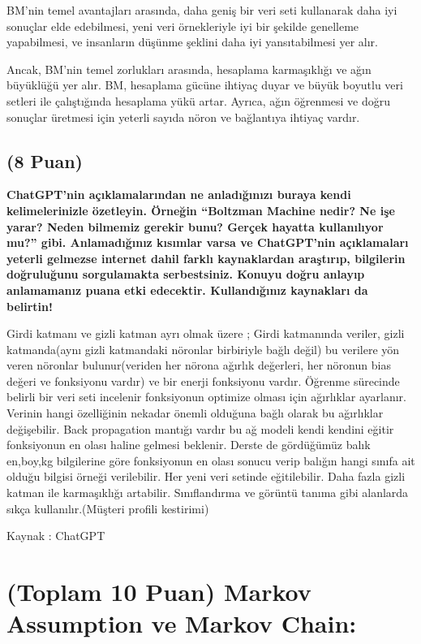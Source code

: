 \documentclass[11pt]{article}
\begin{document}
BM'nin temel avantajları arasında, daha geniş bir veri seti kullanarak daha iyi sonuçlar elde edebilmesi, yeni veri örnekleriyle iyi bir şekilde genelleme yapabilmesi, ve insanların düşünme şeklini daha iyi yansıtabilmesi yer alır.

Ancak, BM'nin temel zorlukları arasında, hesaplama karmaşıklığı ve ağın büyüklüğü yer alır. BM, hesaplama gücüne ihtiyaç duyar ve büyük boyutlu veri setleri ile çalıştığında hesaplama yükü artar. Ayrıca, ağın öğrenmesi ve doğru sonuçlar üretmesi için yeterli sayıda nöron ve bağlantıya ihtiyaç vardır.

\subsection{(8 Puan)} \textbf{ChatGPT’nin açıklamalarından ne anladığınızı buraya kendi kelimelerinizle özetleyin. Örneğin ``Boltzman Machine nedir? Ne işe yarar? Neden bilmemiz gerekir bunu? Gerçek hayatta kullanılıyor mu?'' gibi. Anlamadığınız kısımlar varsa ve ChatGPT’nin açıklamaları yeterli gelmezse internet dahil farklı kaynaklardan araştırıp, bilgilerin doğruluğunu sorgulamakta serbestsiniz. Konuyu doğru anlayıp anlamamanız puana etki edecektir. Kullandığınız kaynakları da belirtin!}

Girdi katmanı ve gizli katman ayrı olmak üzere ; Girdi katmanında veriler, gizli katmanda(aynı gizli katmandaki nöronlar birbiriyle bağlı değil) bu verilere yön veren nöronlar bulunur(veriden her nörona ağırlık değerleri, her nöronun bias değeri ve fonksiyonu vardır) ve bir enerji fonksiyonu vardır. Öğrenme sürecinde belirli bir veri seti incelenir fonksiyonun optimize olması için ağırlıklar ayarlanır. Verinin hangi özelliğinin nekadar önemli olduğuna bağlı olarak bu ağırlıklar değişebilir. Back propagation mantığı vardır bu ağ modeli kendi kendini eğitir fonksiyonun en olası haline gelmesi beklenir. Derste de gördüğümüz balık en,boy,kg bilgilerine göre fonksiyonun en olası sonucu verip balığın hangi sınıfa ait olduğu bilgisi örneği verilebilir. Her yeni veri setinde eğitilebilir. Daha fazla gizli katman ile karmaşıklığı artabilir. Sınıflandırma ve görüntü tanıma gibi alanlarda sıkça kullanılır.(Müşteri profili kestirimi)

Kaynak : ChatGPT

\section{(Toplam 10 Puan) Markov Assumption ve Markov Chain:}
\end{document}
